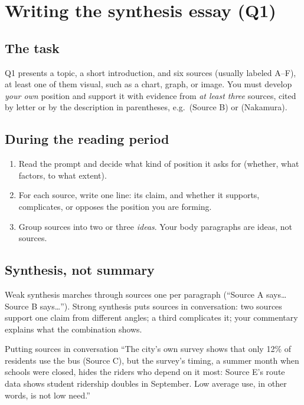 \documentclass[11pt]{article}
\begin{document}
\section{Writing the synthesis essay (Q1)}

\subsection{The task}
Q1 presents a topic, a short introduction, and six sources (usually labeled A--F), at least one of them visual, such as a chart, graph, or image. You must develop \emph{your own} position and support it with evidence from \emph{at least three} sources, cited by letter or by the description in parentheses, e.g.\ (Source B) or (Nakamura).

\subsection{During the reading period}
\begin{enumerate}[leftmargin=1.5em]
\item Read the prompt and decide what kind of position it asks for (whether, what factors, to what extent).
\item For each source, write one line: its claim, and whether it supports, complicates, or opposes the position you are forming.
\item Group sources into two or three \emph{ideas}. Your body paragraphs are ideas, not sources.
\end{enumerate}

\subsection{Synthesis, not summary}
Weak synthesis marches through sources one per paragraph (``Source A says\ldots Source B says\ldots''). Strong synthesis puts sources in conversation: two sources support one claim from different angles; a third complicates it; your commentary explains what the combination shows.

\begin{study}{Putting sources in conversation}
``The city's own survey shows that only 12\% of residents use the bus (Source C), but the survey's timing, a summer month when schools were closed, hides the riders who depend on it most: Source E's route data shows student ridership doubles in September. Low average use, in other words, is not low need.''
\end{study}
\end{document}
